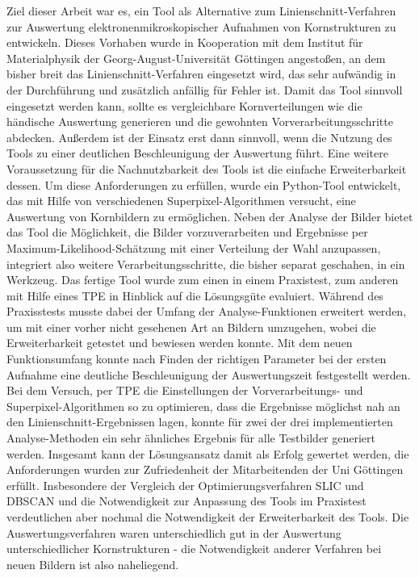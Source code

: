 \documentclass[
  12pt,
  openany]{book}
\begin{document}
Ziel dieser Arbeit war es, ein Tool als Alternative zum Linienschnitt-Verfahren zur Auswertung elektronenmikroskopischer Aufnahmen von Kornstrukturen zu entwickeln. Dieses Vorhaben wurde in Kooperation mit dem Institut für Materialphysik der Georg-August-Universität Göttingen angestoßen, an dem bisher breit das Linienschnitt-Verfahren eingesetzt wird, das sehr aufwändig in der Durchführung und zusätzlich anfällig für Fehler ist.
Damit das Tool sinnvoll eingesetzt werden kann, sollte es vergleichbare Kornverteilungen wie die händische Auswertung generieren und die gewohnten Vorverarbeitungsschritte abdecken. Außerdem ist der Einsatz erst dann sinnvoll, wenn die Nutzung des Tools zu einer deutlichen Beschleunigung der Auswertung führt. Eine weitere Voraussetzung für die Nachnutzbarkeit des Tools ist die einfache Erweiterbarkeit dessen.\newline
Um diese Anforderungen zu erfüllen, wurde ein Python-Tool entwickelt, das mit Hilfe von verschiedenen Superpixel-Algorithmen versucht, eine Auswertung von Kornbildern zu ermöglichen. Neben der Analyse der Bilder bietet das Tool die Möglichkeit, die Bilder vorzuverarbeiten und Ergebnisse per Maximum-Likelihood-Schätzung mit einer Verteilung der Wahl anzupassen, integriert also weitere Verarbeitungsschritte, die bisher separat geschahen, in ein Werkzeug. Das fertige Tool wurde zum einen in einem Praxistest, zum anderen mit Hilfe eines TPE in Hinblick auf die Lösungsgüte evaluiert. Während des Praxisstests musste dabei der Umfang der Analyse-Funktionen erweitert werden, um mit einer vorher nicht gesehenen Art an Bildern umzugehen, wobei die Erweiterbarkeit getestet und bewiesen werden konnte.
Mit dem neuen Funktionsumfang konnte nach Finden der richtigen Parameter bei der ersten Aufnahme eine deutliche Beschleunigung der Auswertungszeit festgestellt werden. Bei dem Versuch, per TPE die Einstellungen der Vorverarbeitungs- und Superpixel-Algorithmen so zu optimieren, dass die Ergebnisse möglichst nah an den Linienschnitt-Ergebnissen lagen, konnte für zwei der drei implementierten Analyse-Methoden ein sehr ähnliches Ergebnis für alle Testbilder generiert werden. \newline
Insgesamt kann der Lösungsansatz damit als Erfolg gewertet werden, die Anforderungen wurden zur Zufriedenheit der Mitarbeitenden der Uni Göttingen erfüllt. Insbesondere der Vergleich der Optimierungsverfahren SLIC und DBSCAN und die Notwendigkeit zur Anpassung des Tools im Praxistest verdeutlichen aber nochmal die Notwendigkeit der Erweiterbarkeit des Tools. Die Auswertungsverfahren waren unterschiedlich gut in der Auswertung unterschiedlicher Kornstrukturen - die Notwendigkeit anderer Verfahren bei neuen Bildern ist also naheliegend.
\end{document}
